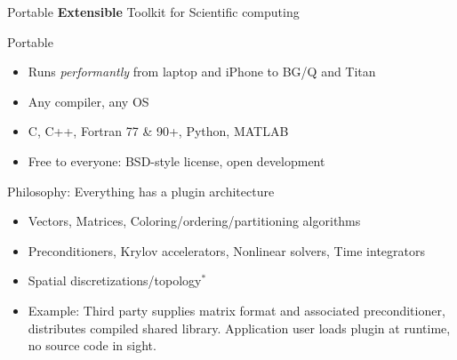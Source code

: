 \documentclass{beamer}
\begin{document}
\begin{frame}{Portable {\bf Extensible} Toolkit for Scientific computing}
  \begin{block}{Portable}
    \begin{itemize}
    \item Runs \emph{performantly} from laptop and iPhone to BG/Q and Titan
    \item Any compiler, any OS
    \item C, C++, Fortran 77 \& 90+, Python, MATLAB
    \item Free to everyone: BSD-style license, open development
    \end{itemize}
  \end{block}
  \begin{block}{Philosophy: Everything has a plugin architecture}
    \begin{itemize}
    \item Vectors, Matrices, Coloring/ordering/partitioning algorithms
    \item Preconditioners, Krylov accelerators, Nonlinear solvers, Time integrators
    \item Spatial discretizations/topology$^*$
    \item Example: Third party supplies matrix format and associated preconditioner, distributes
      compiled shared library.  Application user loads plugin at runtime, no source
      code in sight.
    \end{itemize}
  \end{block}
\end{frame}
\end{document}
